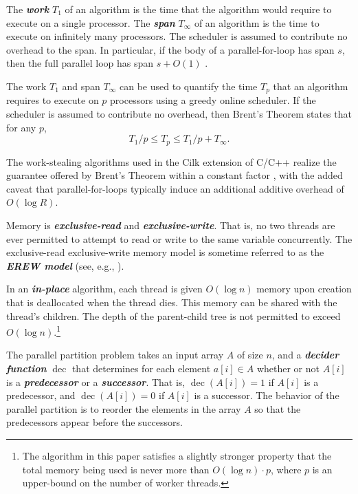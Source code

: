 \documentclass[sigconf]{acmart}
\newcommand{\dec}{\operatorname{dec}}
\newcommand{\defn}[1]       {{\textit{\textbf{\boldmath #1}}}}
\renewcommand{\paragraph}[1]{\vspace{0.09in}\noindent{\bf \boldmath #1.}}
\theoremstyle{remark}
\theoremstyle{remark}
\begin{document}
The \defn{work} $T_1$ of an algorithm is the time that the algorithm
would require to execute on a single processor. The \defn{span}
$T_\infty$ of an algorithm is the time to execute on infinitely many
processors. The scheduler is assumed to contribute no overhead to the
span. In particular, if the body of a
parallel-for-loop has span $s$, then the full parallel loop has span
$s + O(1)$ \cite{Blelloch96,AcarBl16}.

The work $T_1$ and span $T_\infty$ can be used to quantify the time $T_p$
that an algorithm requires to execute on $p$ processors using a greedy
online scheduler. If the scheduler is assumed to contribute no
overhead, then Brent's Theorem \cite{Brent74} states that for any
$p$,
$$T_1 / p \le T_p \le T_1 / p + T_\infty.$$

The work-stealing algorithms used in the Cilk extension of C/C++ realize
the guarantee offered by Brent's Theorem within a constant factor
\cite{BlumofeJo96,BlumofeLe99}, with the added caveat that parallel-for-loops typically induce an additional additive overhead of $O(\log
R)$.

\paragraph{Memory Model} Memory is \defn{exclusive-read} and \defn{exclusive-write}. That is, no two threads are ever permitted to attempt to read or write to the same variable concurrently. The exclusive-read exclusive-write memory model is sometime referred to as the \defn{EREW model} (see, e.g., \cite{Hagerup89}).

In an \defn{in-place} algorithm, each thread is given $O(\log n)$
memory upon creation that is deallocated when the thread dies. This
memory can be shared with the thread's children. The depth of the
parent-child tree is not permitted to exceed $O(\log n)$.\footnote{The
  algorithm in this paper satisfies a slightly stronger property that
  the total memory being used is never more than $O(\log n) \cdot p$,
  where $p$ is an upper-bound on the number of worker threads.}

\paragraph{The Parallel Partition Problem}
The parallel partition problem takes an input array $A$ of size $n$,
and a \defn{decider function} $\dec$ that determines for each element
$a[i] \in A$ whether or not $A[i]$ is a \defn{predecessor} or a
\defn{successor}. That is, $\dec(A[i]) = 1$ if $A[i]$ is a
predecessor, and $\dec(A[i]) = 0$ if $A[i]$ is a successor. The
behavior of the parallel partition is to reorder the elements in the
array $A$ so that the predecessors appear before the successors.
\end{document}
